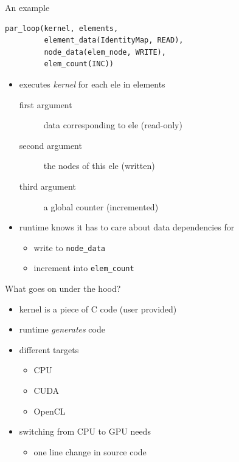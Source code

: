 \documentclass[bigger]{beamer}
\begin{document}
\begin{frame}[fragile,label={sec:orgheadline8}]{An example}
 \begin{verbatim}
par_loop(kernel, elements,
         element_data(IdentityMap, READ),
         node_data(elem_node, WRITE),
         elem_count(INC))
\end{verbatim}

\begin{itemize}
\item executes \emph{kernel} for each ele in elements
\begin{description}
\item[{first argument}] data corresponding to ele (read-only)
\item[{second argument}] the nodes of this ele (written)
\item[{third argument}] a global counter (incremented)
\end{description}

\item runtime knows it has to care about data dependencies for
\begin{itemize}
\item write to \verb~node_data~
\item increment into \verb~elem_count~
\end{itemize}
\end{itemize}
\end{frame}

\begin{frame}[label={sec:orgheadline9}]{What goes on under the hood?}
\begin{itemize}
\item kernel is a piece of C code (user provided)
\item runtime \emph{generates} code
\item different targets
\begin{itemize}
\item CPU
\item CUDA
\item OpenCL
\end{itemize}

\item switching from CPU to GPU needs
\begin{itemize}
\item one line change in source code
\end{itemize}
\end{itemize}
\end{frame}
\end{document}
